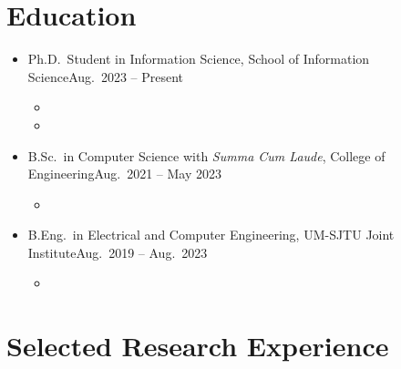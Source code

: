 \documentclass[letterpaper,10.8pt]{article}
\begin{document}
\head%

\section{Education}

\begin{itemize}
      \item {}
            {Ph.D.\ Student in Information Science, School of Information Science}{Aug.\ 2023 -- Present}
            \begin{itemize}
                  \item {}
                  \item {}
            \end{itemize}

      \item {}
            {B.Sc.\ in Computer Science with \emph{Summa Cum Laude}, College of Engineering}{Aug.\ 2021 -- May 2023}
            \begin{itemize}
                  \item {}
            \end{itemize}

      \item {}
            {B.Eng.\ in Electrical and Computer Engineering, UM-SJTU Joint Institute}{Aug.\ 2019 -- Aug.\ 2023}
            \begin{itemize}
                  \item {}
            \end{itemize}
\end{itemize}

\section{Selected Research Experience}
\end{document}
